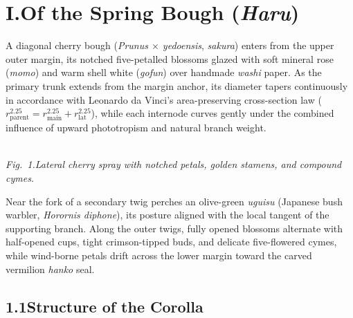\documentclass[11pt,a4paper,twoside]{article}
\begin{document}

\section*{I.\quad Of the Spring Bough (\emph{Haru})}

A diagonal cherry bough (\emph{Prunus $\times$ yedoensis}, \emph{sakura}) enters from the upper outer margin, its notched five-petalled blossoms glazed with soft mineral rose (\emph{momo}) and warm shell white (\emph{gofun}) over handmade \emph{washi} paper. As the primary trunk extends from the margin anchor, its diameter tapers continuously in accordance with Leonardo da Vinci's area-preserving cross-section law ($r_{\text{parent}}^{2.25} = r_{\text{main}}^{2.25} + r_{\text{lat}}^{2.25}$), while each internode curves gently under the combined influence of upward phototropism and natural branch weight.

\medskip
\begin{center}
\kachospray[width=0.82\linewidth, height=32mm, motif=sakura, seed=14, from=left]\\[3pt]
{\small\itshape Fig.~1.\quad Lateral cherry spray with notched petals, golden stamens, and compound cymes.}
\end{center}
\medskip

Near the fork of a secondary twig perches an olive-green \emph{uguisu} (Japanese bush warbler, \emph{Horornis diphone}), its posture aligned with the local tangent of the supporting branch. Along the outer twigs, fully opened blossoms alternate with half-opened cups, tight crimson-tipped buds, and delicate five-flowered cymes, while wind-borne petals drift across the lower margin toward the carved vermilion \emph{hanko} seal.

\subsection*{1.1\quad Structure of the Corolla}
\end{document}
